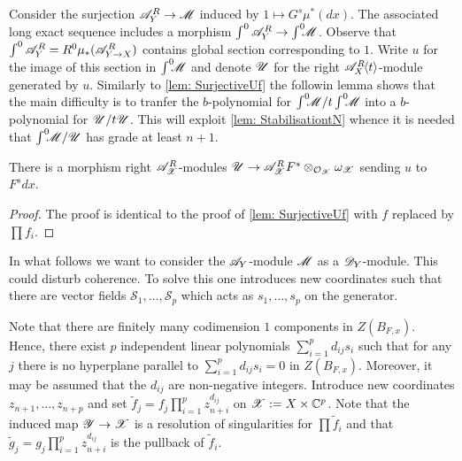 Consider the surjection $\mathscr{A}_Y^R\to \mathscr{M}$ induced by $1\mapsto G^s \mu^*(dx)$.
The associated long exact sequence includes a morphism $\int^0 \mathscr{A}_Y^R \to \int^0 \mkern -8mu\mathscr{M}$.
Observe that $\int^0 \mathscr{A}_Y^R = R^0\mu_*(\mathscr{A}_{Y\to X}^R)$ contains global section corresponding to $1$.
Write $u$ for the image of this section in $\int^0 \mkern -8mu \mathscr{M}$ and denote $\mathscr{U}$ for the right $\mathscr{A}_X^R\mkern-5mu\left\langle t \right\rangle$-module generated by $u$.
Similarly to \cref{lem: SurjectiveUf} the followin lemma shows that the main difficulty is to tranfer the $b$-polynomial for $\int^0 \mkern -8mu\mathscr{M}/t\int^0 \mkern -8mu\mathscr{M}$ into a $b$-polynomial for $\mathscr{U}/t\mathscr{U}$.
This will exploit \cref{lem: StabilisationtN} whence it is needed that $\int^0 \mkern -8mu\mathscr{M} /\mathscr{U}$ has grade at least $n+1$.\\
\begin{lemma}\label{lem: SurjectionUF}
  There is a morphism right $\mathscr{A}_{\mathscr{X}}^R$-modules $\mathscr{U}\to \mathscr{A}_{\mathscr{X}}^RF^s \otimes_{\mathcal{O}_{\mathscr{X}}}\omega_{\mathscr{X}}$ sending $u$ to $F^sdx$.
\end{lemma}
\begin{proof}
   The proof is identical to the proof of \cref{lem: SurjectiveUf} with $f$ replaced by $\prod f_i$.
\end{proof}

In what follows we want to consider the $\mathscr{A}_Y$-module $\mathscr{M}$ as a $\mathscr{D}_Y$-module.
This could disturb coherence.
To solve this one introduces new coordinates such that there are vector fields $\mathcal{S}_1,\ldots, \mathcal{S}_p$ which acts as $s_1,\ldots,s_p$ on the generator.

Note that there are finitely many codimension $1$ components in $Z(B_{F,x})$.
Hence, there exist $p$ independent linear polynomials $\sum_{i=1}^p d_{ij}s_i$ such that for any $j$ there is no hyperplane parallel to $\sum_{i=1}^p d_{ij}s_i = 0$ in $Z(B_{F,x})$.
Moreover, it may be assumed that the $d_{ij}$ are non-negative integers.
Introduce new coordinates $z_{n+1}, \ldots,z_{n+p}$ and set $\widetilde{f}_j = f_j\prod_{i=1}^p z_{n+i}^{d_{ij}}$ on $\mathscr{X} := X\times \mathbb{C}^p$.
Note that the induced map $\mathscr{Y} \to \mathscr{X}$ is a resolution of singularities for $\prod \widetilde{f}_i$ and that $\widetilde{g}_j = g_j\prod_{i=1}^p z_{n+i}^{d_{ij}}$ is the pullback of $\widetilde{f}_i$.

